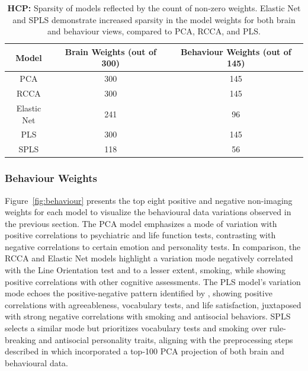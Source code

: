 \begin{table}[h]
    \centering
    \caption{\textbf{HCP:} Sparsity of models reflected by the count of non-zero weights. Elastic Net and SPLS demonstrate increased sparsity in the model weights for both brain and behaviour views, compared to PCA, RCCA, and PLS.}
    \begin{tabular}{|c|c|c|}
        \hline
        Model       & Brain Weights (out of 300) & Behaviour Weights (out of 145) \\
        \hline
        PCA         & 300           & 145               \\
        RCCA        & 300           & 145               \\
        Elastic Net & 241           & 96                \\
        PLS         & 300           & 145               \\
        SPLS        & 118           & 56                \\
        \hline
    \end{tabular}\label{tab:sparse-weights-hcp}
\end{table}

\subsubsection{Behaviour Weights}

Figure~\ref{fig:behaviour} presents the top eight positive and negative non-imaging weights for each model to visualize the behavioural data variations observed in the previous section. The PCA model emphasizes a mode of variation with positive correlations to psychiatric and life function tests, contrasting with negative correlations to certain emotion and personality tests. In comparison, the RCCA and Elastic Net models highlight a variation mode negatively correlated with the Line Orientation test and to a lesser extent, smoking, while showing positive correlations with other cognitive assessments. The PLS model's variation mode echoes the positive-negative pattern identified by \cite{smith2015positive}, showing positive correlations with agreeableness, vocabulary tests, and life satisfaction, juxtaposed with strong negative correlations with smoking and antisocial behaviors. SPLS selects a similar mode but prioritizes vocabulary tests and smoking over rule-breaking and antisocial personality traits, aligning with the preprocessing steps described in \cite{smith2015positive} which incorporated a top-100 PCA projection of both brain and behavioural data.

